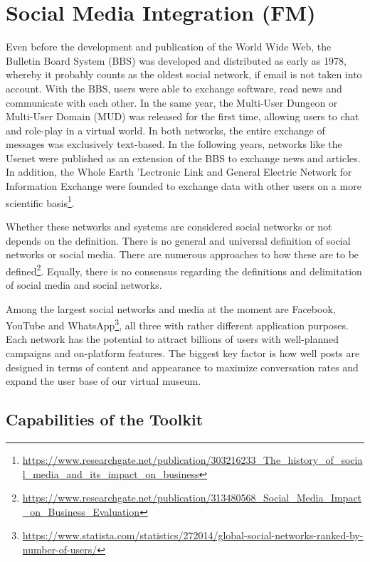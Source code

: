 \chapter{Social Media Integration (FM)}
\label{cha:Social Media Integration}

Even before the development and publication of the World Wide Web, the Bulletin Board System (BBS) was developed and distributed as early as 1978, whereby it probably counts as the oldest social network, if email is not taken into account. With the BBS, users were able to exchange software, read news and communicate with each other. In the same year, the Multi-User Dungeon or Multi-User Domain (MUD) was released for the first time, allowing users to chat and role-play in a virtual world. In both networks, the entire exchange of messages was exclusively text-based. In the following years, networks like the Usenet were published as an extension of the BBS to exchange news and articles. In addition, the Whole Earth 'Lectronic Link and General Electric Network for Information Exchange were founded to exchange data with other users on a more scientific basis\footnote{\label{rg_history}\url{https://www.researchgate.net/publication/303216233_The_history_of_social_media_and_its_impact_on_business}}.

Whether these networks and systems are considered social networks or not depends on the definition. There is no general and universal definition of social networks or social media. There are numerous approaches to how these are to be defined\footnote{\url{https://www.researchgate.net/publication/313480568_Social_Media_Impact_on_Business_Evaluation}}. Equally, there is no consensus regarding the definitions and delimitation of social media and social networks.

Among the largest social networks and media at the moment are Facebook, YouTube and WhatsApp\footnote{\url{https://www.statista.com/statistics/272014/global-social-networks-ranked-by-number-of-users/}}, all three with rather different application purposes. Each network has the potential to attract billions of users with well-planned campaigns and on-platform features. The biggest key factor is how well posts are designed in terms of content and appearance to maximize conversation rates and expand the user base of our virtual museum.

\section{Capabilities of the Toolkit}

